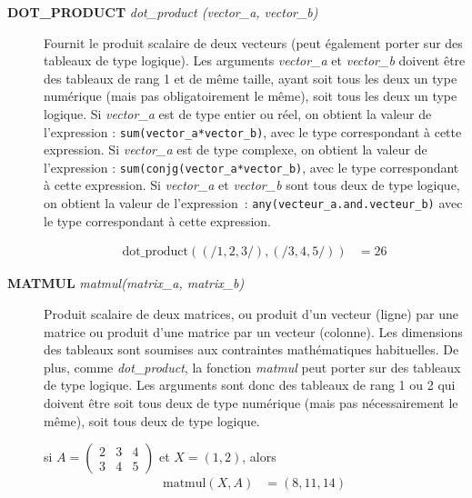 \documentclass[a4paper,twoside]{article}
\begin{document}
\begin{description}

\item[\textbf{DOT\_PRODUCT} \emph{dot\_product (vector\_a, vector\_b)}] Fournit le produit scalaire de deux vecteurs (peut égale\-ment porter sur des tableaux de type logique). Les arguments \emph{vector\_a}  et \emph{vector\_b} doivent être des tableaux de rang 1 et de même taille, ayant soit tous les deux un type numérique (mais pas obligatoirement le même), soit tous les deux un type logique. Si \emph{vector\_a} est de type entier ou réel, on obtient la valeur de l'expression : \texttt{sum(vector\_a*vector\_b)}, avec le type correspondant à cette expression. Si \emph{vector\_a} est de type complexe, on obtient la valeur de l'expression : \texttt{sum(conjg(vector\_a*vector\_b)}, avec le type correspondant à cette expression. Si \emph{vector\_a} et \emph{vector\_b} sont tous deux de type logique, on obtient la valeur de l'expression~: \texttt{any(vecteur\_a.and.vecteur\_b)} avec le type correspondant à cette expression. 
\begin{exemple}
\begin{align}
\mathrm{dot\_product}((/1,2,3/),(/3,4,5/))  &= 26
\end{align}
\end{exemple}

\item[\textbf{MATMUL} \emph{matmul(matrix\_a, matrix\_b)}] Produit scalaire de deux matrices, ou produit d'un vecteur (ligne) par une matrice ou produit d'une matrice par un vecteur (colonne). Les dimensions des tableaux sont soumises aux contraintes mathématiques habituelles. De plus, comme \emph{dot\_product}, la fonction \emph{matmul} peut porter sur des tableaux de type logique. Les arguments sont donc des tableaux de rang 1 ou 2 qui doivent être soit tous deux de type numérique (mais pas nécessairement le même), soit tous deux de type logique. 
\begin{exemple}
si $A=\left(
\begin{array}{ccc}
    2 & 3 & 4  \\
    3 & 4 & 5
\end{array}\right)$ et $X=(1,2)$, alors 
\begin{align}
\mathrm{matmul}(X,A)  &= (8,11,14)
\end{align}

\end{exemple}
   
\end{description}
\end{document}
